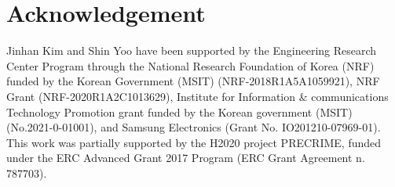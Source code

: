 
\section*{Acknowledgement}
Jinhan Kim and Shin Yoo have been supported by the Engineering Research Center
Program through the National Research Foundation of Korea (NRF) funded by the
Korean Government (MSIT) (NRF-2018R1A5A1059921), NRF Grant (NRF-2020R1A2C1013629),
Institute for Information \& communications Technology Promotion grant funded by
the Korean government (MSIT) (No.2021-0-01001), and Samsung Electronics (Grant
No. IO201210-07969-01). This work was partially supported by the H2020 project
PRECRIME, funded under the ERC Advanced Grant 2017 Program (ERC Grant Agreement
n. 787703).